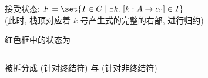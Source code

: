 \begin{frame}{}

  \pause
  \vspace{0.50cm}
  \begin{center}
    接受状态: $F = \set{I \in C \mid \exists k.\; [k: A \to \alpha \cdot] \in I}$ \\[5pt]
    (此时, 栈顶对应着 $k$ 号产生式的完整的右部, 进行归约)
  \end{center}
\end{frame}

\begin{frame}{}
  \begin{center}

    红色框中的状态为 
  \end{center}
\end{frame}

\begin{frame}{}
  \begin{center}

    \vspace{0.30cm}
  \end{center}
\end{frame}

\begin{frame}{}
  \begin{center}

    \begin{columns}
        
    \end{columns}

    \vspace{0.20cm}
    被拆分成  {\small (针对终结符)}
    与  {\small (针对非终结符)}
  \end{center}
\end{frame}


